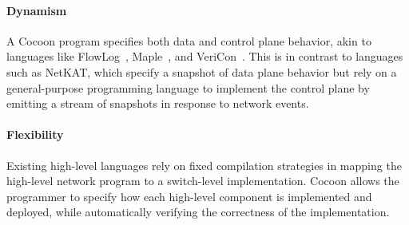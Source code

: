 \documentclass[letterpaper,10pt,twocolumn]{article}
\begin{document}

\paragraph{Dynamism} A Cocoon program specifies both data and 
control plane behavior, akin to languages like 
FlowLog~\cite{Nelson_FSK_14}, Maple~\cite{Voellmy_WYFH_13}, and 
VeriCon~\cite{Ball_BGIKSSV_14}.  This is in contrast to languages 
such as NetKAT, which specify a snapshot of data plane behavior 
but rely on a general-purpose programming language to implement 
the control plane by emitting a stream of snapshots in response to 
network events.


\paragraph{Flexibility} Existing high-level languages rely on 
fixed compilation strategies in mapping the high-level network 
program to a switch-level implementation.  Cocoon allows the 
programmer to specify how each high-level component is implemented 
and deployed, while automatically verifying the correctness of the 
implementation.



\vspace{2mm}

%
\end{document}
